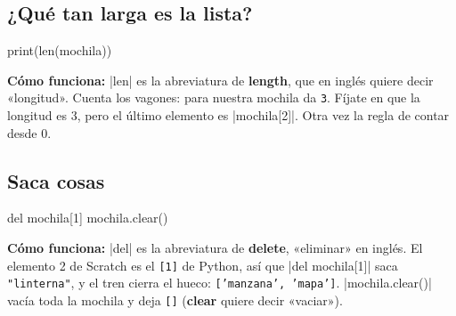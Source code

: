 \subsection*{¿Qué tan larga es la lista?}

\begin{tcbraster}[raster columns=2, raster equal height=rows, raster column skip=12pt, raster valign=center]
\begin{tcolorbox}[colback=white, colframe=white, boxrule=0pt, valign=center]
\begin{scratch}
\end{scratch}
\end{tcolorbox}
\begin{code}
print(len(mochila))
\end{code}
\end{tcbraster}

\textbf{Cómo funciona:} \py|len| es la abreviatura de \textbf{length}, que en inglés quiere decir «longitud». Cuenta los vagones: para nuestra mochila da \texttt{3}. Fíjate en que la longitud es 3, pero el último elemento es \py|mochila[2]|. Otra vez la regla de contar desde 0.

\subsection*{Saca cosas}

\begin{tcbraster}[raster columns=2, raster equal height=rows, raster column skip=12pt, raster valign=center]
\begin{tcolorbox}[colback=white, colframe=white, boxrule=0pt, valign=center]
\begin{scratch}
\end{scratch}
\end{tcolorbox}
\begin{code}
del mochila[1]
mochila.clear()
\end{code}
\end{tcbraster}

\textbf{Cómo funciona:} \py|del| es la abreviatura de \textbf{delete}, «eliminar» en inglés. El elemento 2 de Scratch es el \texttt{[1]} de Python, así que \py|del mochila[1]| saca \texttt{"linterna"}, y el tren cierra el hueco: \texttt{['manzana', 'mapa']}. \py|mochila.clear()| vacía toda la mochila y deja \texttt{[]} (\textbf{clear} quiere decir «vaciar»).

